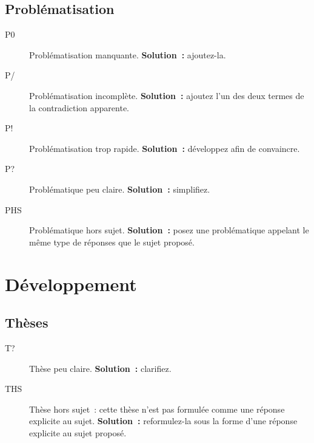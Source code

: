 \documentclass[a4paper,11pt]{article}
\begin{document}
\subsection{Problématisation}
\label{sec:org0efd167}
\begin{description}
\item[{P0}] Problématisation manquante. \textbf{Solution :} ajoutez-la.
\item[{P/}] Problématisation incomplète. \textbf{Solution :} ajoutez l'un des deux
termes de la contradiction apparente.
\item[{P\string!}] Problématisation trop rapide. \textbf{Solution :} développez afin de
convaincre.
\item[{P\string?}] Problématique peu claire. \textbf{Solution :} simplifiez.
\item[{PHS}] Problématique hors sujet. \textbf{Solution :} posez une problématique
appelant le même type de réponses que le sujet proposé.
\end{description}

\section{Développement}
\label{sec:org37c3a5f}

\subsection{Thèses}
\label{sec:org5a19121}
\begin{description}
\item[{T\string?}] Thèse peu claire. \textbf{Solution :} clarifiez.
\item[{THS}] Thèse hors sujet : cette thèse n'est pas formulée comme une
réponse explicite au sujet. \textbf{Solution :} reformulez-la sous la forme
d'une réponse explicite au sujet proposé.
\end{description}
\end{document}
